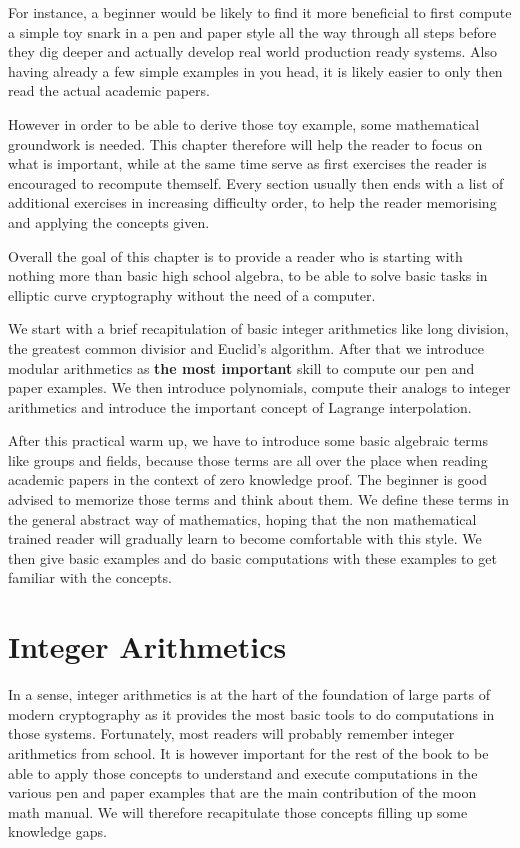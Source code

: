 For instance, a beginner would be likely to find it more beneficial to first compute a simple toy snark in a pen and paper style all the way through all steps before they dig deeper and actually develop real world production ready systems. Also having already a few simple examples in you head, it is likely easier to only then read the actual academic papers. 

However in order to be able to derive those toy example, some mathematical groundwork is needed. This chapter therefore will help the reader to focus on what is important, while at the same time serve as first exercises the reader is encouraged to recompute themself. Every section usually then ends with a list of additional exercises in increasing difficulty order, to help the reader memorising and applying the concepts given. 

Overall the goal of this chapter is to provide a reader who is starting with nothing more than basic high school algebra, to be able to solve basic tasks in elliptic curve cryptography without the need of a computer.


We start with a brief recapitulation of basic integer arithmetics like long division, the greatest common divisior and Euclid's algorithm. After that we introduce modular arithmetics as \textbf{the most important} skill to compute our pen and paper examples. We then introduce polynomials, compute their analogs to integer arithmetics and introduce the important concept of Lagrange interpolation.

After this practical warm up, we have to introduce some basic algebraic terms like groups and fields, because those terms are all over the place when reading academic papers in the context of zero knowledge proof. The beginner is good advised to memorize those terms and think about them. We define these terms in the general abstract way of mathematics, hoping that the non mathematical trained reader will gradually learn to become comfortable with this style. We then give basic examples and do basic computations with these examples to get familiar with the concepts. 

\section{Integer Arithmetics}
\label{integer_arithmetics}
In a sense, integer arithmetics is at the hart of the foundation of large parts of modern cryptography as it provides the most basic tools to do computations in those systems. Fortunately, most readers will probably remember integer arithmetics from school. It is however important for the rest of the book to be able to apply those concepts to understand and execute computations in the various pen and paper examples that are the main contribution of the moon math manual. We will therefore recapitulate those concepts filling up some knowledge gaps.

